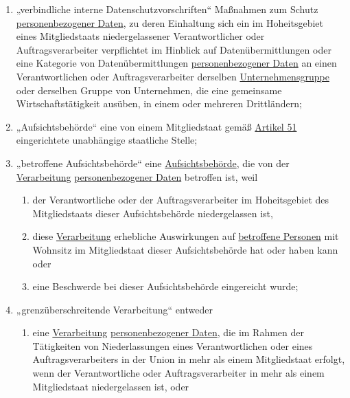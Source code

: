 \begin{enumerate}
  \item „verbindliche interne Datenschutzvorschriften“ Maßnahmen zum Schutz \hyperref[itm:04-1]{personenbezogener Daten}, zu deren Einhaltung
   sich ein im Hoheitsgebiet eines Mitgliedstaats niedergelassener Verantwortlicher oder Auftragsverarbeiter
   verpflichtet im Hinblick auf Datenübermittlungen oder eine Kategorie von Datenübermittlungen \hyperref[itm:04-1]{personenbezogener Daten}
   an einen Verantwortlichen oder Auftragsverarbeiter derselben \hyperref[itm:04-19]{Unternehmensgruppe} oder derselben Gruppe von
   Unternehmen, die eine gemeinsame Wirtschaftstätigkeit ausüben, in einem oder mehreren Drittländern;
  \label{itm:04-20}

  \item „Aufsichtsbehörde“ eine von einem Mitgliedstaat gemäß \hyperref[ch:51]{Artikel 51} eingerichtete unabhängige
   staatliche Stelle;
  \label{itm:04-21}   

  \item „betroffene Aufsichtsbehörde“ eine \hyperref[itm:42-21]{Aufsichtsbehörde}, die von der \hyperref[itm:04-2]
   {Verarbeitung} \hyperref[itm:04-1]{personenbezogener Daten} betroffen ist, weil
  \label{itm:04-22}

  \begin{enumerate}

    \item der Verantwortliche oder der Auftragsverarbeiter im Hoheitsgebiet des Mitgliedstaats dieser Aufsichtsbehörde
     niedergelassen ist,
    \label{itm:04-22a}

    \item diese \hyperref[itm:04-2]{Verarbeitung} erhebliche Auswirkungen auf \hyperref[itm:04-1]{betroffene Personen} mit Wohnsitz im Mitgliedstaat dieser
     Aufsichtsbehörde hat oder haben kann oder
    \label{itm:04-22b}

    \item eine Beschwerde bei dieser Aufsichtsbehörde eingereicht wurde;
  \label{itm:04-22c}

  \end{enumerate}

  \item „grenzüberschreitende Verarbeitung“ entweder
  \label{itm:04-23}

  \begin{enumerate}

    \item eine \hyperref[itm:04-2]{Verarbeitung} \hyperref[itm:04-1]{personenbezogener Daten}, die im Rahmen der Tätigkeiten von Niederlassungen eines
     Verantwortlichen oder eines Auftragsverarbeiters in der Union in mehr als einem Mitgliedstaat erfolgt, wenn der
     Verantwortliche oder Auftragsverarbeiter in mehr als einem Mitgliedstaat niedergelassen ist, oder
    \label{itm:04-23a}


\end{enumerate}
\end{enumerate}
